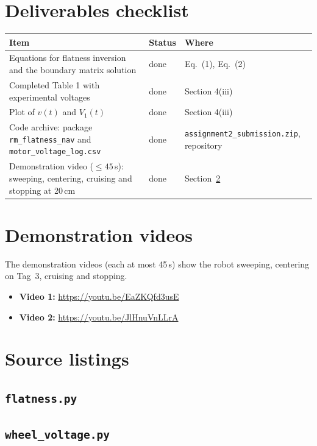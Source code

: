 \documentclass[11pt,a4paper]{article}
\newcommand{\videolinkone}{\url{https://youtu.be/EaZKQfd3usE}}
\newcommand{\videolinktwo}{\url{https://youtu.be/JlHnuVnLLrA}}
\begin{document}
\section{Deliverables checklist}
\begin{center}\small
\begin{tabular}{@{}p{8.2cm}p{2.0cm}p{5.2cm}@{}}
\toprule
\textbf{Item} & \textbf{Status} & \textbf{Where}\\
\midrule
Equations for flatness inversion and the boundary matrix solution & done & Eq.~(1), Eq.~(2)\\
Completed Table 1 with experimental voltages & done & Section 4(iii)\\
Plot of $v(t)$ and $V_1(t)$ & done & Section 4(iii)\\
Code archive: package \texttt{rm\_flatness\_nav} and \texttt{motor\_voltage\_log.csv} & done & \texttt{assignment2\_submission.zip}, repository\\
Demonstration video ($\le45$\,s): sweeping, centering, cruising and stopping at 20\,cm & done & Section~\ref{sec:videos}\\
\bottomrule
\end{tabular}
\end{center}

\section{Demonstration videos}\label{sec:videos}
The demonstration videos (each at most 45\,s) show the robot sweeping, centering on Tag~3, cruising and stopping.
\begin{itemize}
  \item \textbf{Video 1:} \videolinkone{}
  \item \textbf{Video 2:} \videolinktwo{}
\end{itemize}

\appendix
\section{Source listings}
\subsection*{\texttt{flatness.py}}
{}
\subsection*{\texttt{wheel\_voltage.py}}
{}
\end{document}
